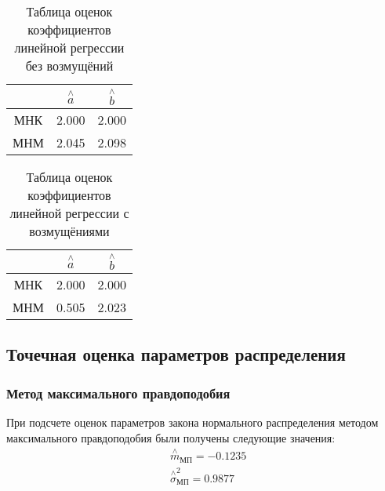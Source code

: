 \documentclass[a4]{article}
\begin{document}
\begin{table}[H]
\caption{Таблица оценок коэффициентов линейной регрессии без возмущёний}
\label{tab:my_label1}
\begin{center}
\vspace{5mm}
\begin{tabular}{|c|c|c|}
\hline
& $\overset{\wedge}{a}$ & $\overset{\wedge}{b}$\\
\hline
МНК &2.000&2.000\\
\hline
МНМ &2.045&2.098\\
\hline
\end{tabular}
\end{center}
\end{table}


\begin{table}[H]
\caption{Таблица оценок коэффициентов линейной регрессии с возмущёниями}
\label{tab:my_label2}
\begin{center}
\vspace{5mm}
\begin{tabular}{|c|c|c|}
\hline
& $\overset{\wedge}{a}$ & $\overset{\wedge}{b}$\\
\hline
МНК &2.000&2.000\\
\hline
МНМ &0.505 &2.023\\
\hline
\end{tabular}
\end{center}
\end{table}

\subsection{Точечная оценка параметров распределения}
\subsubsection{Метод максимального правдоподобия}

При подсчете оценок параметров закона нормального распределения методом максимального правдоподобия были получены следующие значения:
\begin{equation}
\begin{split}
    &\overset{\wedge}{m}_{\text{МП}} = -0.1235\\
   &  \overset{\wedge}{\sigma}^2_{\text{МП}} = 0.9877
\end{split}
\end{equation}
\end{document}
